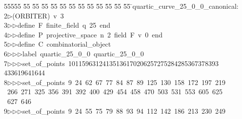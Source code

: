 %
%
\begin{tabbing}
55555 \= 55 \= 55 \= 55 \= 55 \= 55 \= 55 \= 55 \= 55 \= 55 \= 55 \= 55 \= 55 \= \>quartic\_curve\_25\_0\_0\_canonical:\ \\[0pt]
2\>$\triangleright$\>(ORBITER)\ v\ 3\ \\[0pt]
3\>$\triangleright$\>$\triangleright$\>define\ F\ finite\_field\ q\ 25\ end\ \\[0pt]
4\>$\triangleright$\>$\triangleright$\>define\ P\ projective\_space\ n\ 2\ field\ F\ v\ 0\ end\ \\[0pt]
5\>$\triangleright$\>$\triangleright$\>define\ C\ combinatorial\_object\ \\[0pt]
6\>$\triangleright$\>$\triangleright$\>$\triangleright$\>label\ quartic\_25\_0\_0\ quartic\_25\_0\_0\ \\[0pt]
7\>$\triangleright$\>$\triangleright$\>$\triangleright$\>set\_of\_points\ 10115963124135136170206257275284285367378393\\[0pt]
\>433619641644\ \\[0pt]
8\>$\triangleright$\>$\triangleright$\>$\triangleright$\>set\_of\_points\ 9\ 24\ 62\ 67\ 77\ 84\ 87\ 89\ 125\ 130\ 158\ 172\ 197\ 219\\[0pt]
\>\ 266\ 271\ 325\ 356\ 391\ 392\ 400\ 429\ 454\ 458\ 470\ 503\ 531\ 553\ 605\ 625\\[0pt]
\>\ 627\ 646\ \\[0pt]
9\>$\triangleright$\>$\triangleright$\>$\triangleright$\>set\_of\_points\ 9\ 24\ 55\ 75\ 79\ 88\ 93\ 94\ 112\ 142\ 186\ 213\ 230\ 249\\[0pt]

\end{tabbing}
